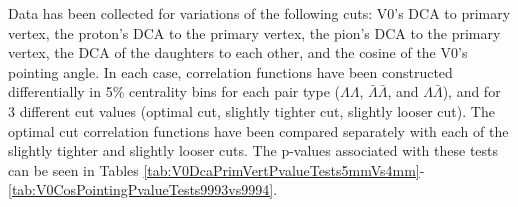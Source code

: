 

Data has been collected for variations of the following cuts: V0's DCA to primary vertex, the proton's DCA to the primary vertex, the pion's DCA to the primary vertex, the DCA of the daughters to each other, and the cosine of the V0's pointing angle.  In each case, correlation functions have been constructed differentially in 5\% centrality bins for each pair type ($\Lambda\Lambda$, $\bar{\Lambda}\bar{\Lambda}$, and $\Lambda\bar{\Lambda}$), and for 3 different cut values (optimal cut, slightly tighter cut, slightly looser cut).  The optimal cut correlation functions have been compared separately with each of the slightly tighter and slightly looser cuts.  The p-values associated with these tests can be seen in Tables \ref{tab:V0DcaPrimVertPvalueTests5mmVs4mm}-\ref{tab:V0CosPointingPvalueTests9993vs9994}.

